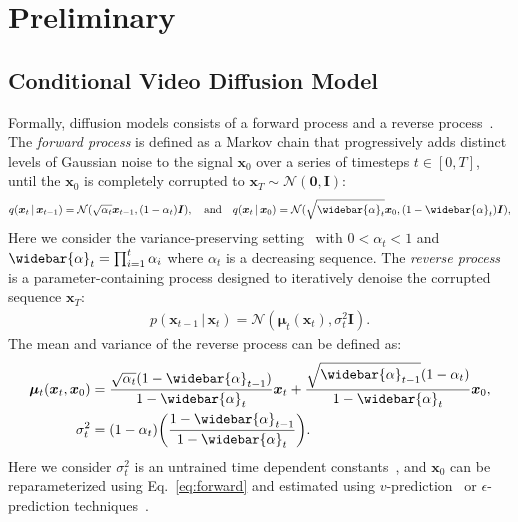 \documentclass{article} %
\def\x{{\bm{x}}}
\def\I{{\bm{I}}}
\newcommand{\mymid}{\,|\,}
\begin{document}
\section{Preliminary}
\subsection{Conditional Video Diffusion Model}
Formally, diffusion models consists of a {forward process} and a {reverse  process}~\citep{sohl2015deep, ho2020denoising, song2020score}. The \emph{forward process} is defined as a Markov chain that progressively adds distinct levels of Gaussian noise to the signal $\x_0$ over a series of timesteps $t \in [0,T]$, until the $\x_0$ is completely corrupted to $\x_T\sim \mathcal{N}(\bm{0}, \I)$: 
\begin{align}
\label{eq:forward}
q(\x_{t}\mymid \x_{t-1}) = \mathcal{N}(\sqrt{\alpha_t}\x_{t-1}, (1-\alpha_t)\I),
\quad\text{and}\quad
q(\x_{t}\mymid \x_{0}) = \mathcal{N}(\sqrt{\widebar{\alpha}_t}\x_{0}, (1-\widebar{\alpha}_t)\I),
\end{align}
Here we consider the variance-preserving setting~\citep{score-sde} with $0 < \alpha_t < 1$ and $\widebar{\alpha}_t = \prod_{i = 1}^t \alpha_i$ where $\alpha_t$ is a decreasing sequence. The \emph{reverse process} is a parameter-containing process designed to iteratively denoise the corrupted sequence $\x_{T}$:
\begin{align}
p(\x_{t-1}\mymid \x_{t}) = \mathcal{N}(\bm{\mu}_t(\x_{t}), \sigma_t^2\I).
\end{align}
The mean and variance of the reverse process can be defined as:
\begin{align}
\bm{\mu}_t(\x_{t}, \x_{0}) &= \frac{\sqrt{\alpha_t}(1-\widebar{\alpha}_{t-1})}{1-\widebar{\alpha}_t}\x_{t} + \frac{\sqrt{\widebar{\alpha}_{t-1}}(1-\alpha_t)}{1-\widebar{\alpha}_{t}}\x_0,
\\
\sigma_t^2 &= (1-\alpha_t)\bigg(\frac{1-\widebar{\alpha}_{t-1}}{1-\widebar{\alpha}_t}\bigg).
\end{align}
Here we consider $\sigma_t^2$ is an untrained time dependent constants~\citep{ho2020denoising,im-ddpm}, and $\x_0$ can be reparameterized using Eq.~\ref{eq:forward} and estimated using $v$-prediction~\citep{prog-distill} or $\epsilon$-prediction techniques~\citep{ho2020denoising}.
\end{document}
